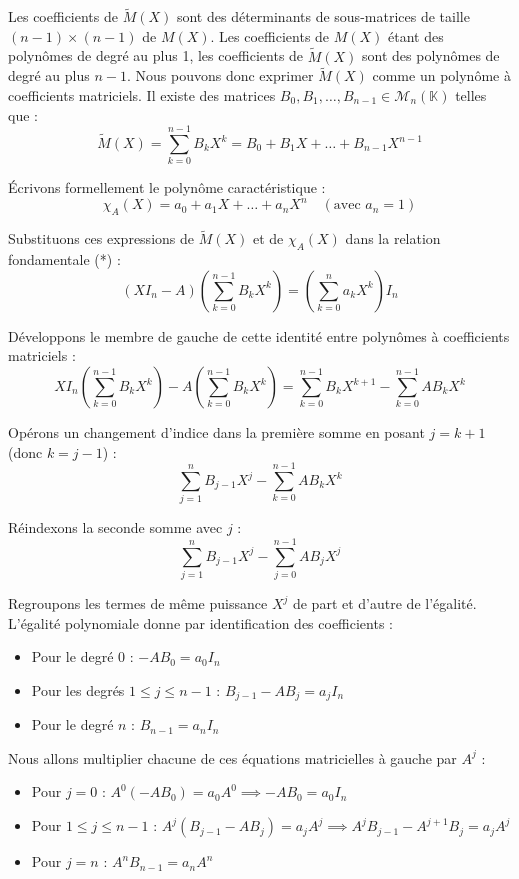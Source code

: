\documentclass[11pt,a4paper]{article}
\begin{document}
Les coefficients de $\widetilde{M}(X)$ sont des déterminants de sous-matrices de taille $(n-1) \times (n-1)$ de $M(X)$. Les coefficients de $M(X)$ étant des polynômes de degré au plus 1, les coefficients de $\widetilde{M}(X)$ sont des polynômes de degré au plus $n-1$.
Nous pouvons donc exprimer $\widetilde{M}(X)$ comme un polynôme à coefficients matriciels. Il existe des matrices $B_0, B_1, \dots, B_{n-1} \in \mathcal{M}_n(\mathbb{K})$ telles que :
$$\widetilde{M}(X) = \sum_{k=0}^{n-1} B_k X^k = B_0 + B_1 X + \dots + B_{n-1} X^{n-1}$$

Écrivons formellement le polynôme caractéristique :
$$\chi_A(X) = a_0 + a_1 X + \dots + a_n X^n \quad (\text{avec } a_n = 1)$$

Substituons ces expressions de $\widetilde{M}(X)$ et de $\chi_A(X)$ dans la relation fondamentale (*) :
$$(X I_n - A) \left( \sum_{k=0}^{n-1} B_k X^k \right) = \left( \sum_{k=0}^n a_k X^k \right) I_n$$

Développons le membre de gauche de cette identité entre polynômes à coefficients matriciels :
$$X I_n \left( \sum_{k=0}^{n-1} B_k X^k \right) - A \left( \sum_{k=0}^{n-1} B_k X^k \right) = \sum_{k=0}^{n-1} B_k X^{k+1} - \sum_{k=0}^{n-1} A B_k X^k$$

Opérons un changement d'indice dans la première somme en posant $j = k+1$ (donc $k = j-1$) :
$$ \sum_{j=1}^n B_{j-1} X^j - \sum_{k=0}^{n-1} A B_k X^k $$

Réindexons la seconde somme avec $j$ :
$$ \sum_{j=1}^n B_{j-1} X^j - \sum_{j=0}^{n-1} A B_j X^j $$

Regroupons les termes de même puissance $X^j$ de part et d'autre de l'égalité. L'égalité polynomiale donne par identification des coefficients :
\begin{itemize}
\item Pour le degré 0 : $-A B_0 = a_0 I_n$
\item Pour les degrés $1 \le j \le n-1$ : $B_{j-1} - A B_j = a_j I_n$
\item Pour le degré $n$ : $B_{n-1} = a_n I_n$
\end{itemize}

Nous allons multiplier chacune de ces équations matricielles à gauche par $A^j$ :
\begin{itemize}
\item Pour $j=0$ : $A^0 (-A B_0) = a_0 A^0 \implies -A B_0 = a_0 I_n$
\item Pour $1 \le j \le n-1$ : $A^j (B_{j-1} - A B_j) = a_j A^j \implies A^j B_{j-1} - A^{j+1} B_j = a_j A^j$
\item Pour $j=n$ : $A^n B_{n-1} = a_n A^n$
\end{itemize}
\end{document}

